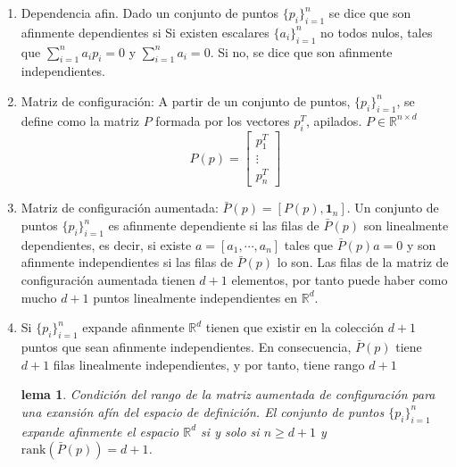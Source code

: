 \documentclass[10pt,a4paper]{article}
\newtheorem{lem}{lema}
\begin{document}
\begin{enumerate}
\item Dependencia afin. Dado un conjunto de puntos $\{p_i\}_{i=1}^n$ se dice que son afinmente dependientes si Si existen escalares $\{a_i\}_{i=1}^n$ no todos nulos, tales que $\sum_{i=1}^na_ip_i =0$ y $\sum_{i=1}^na_i=0$. Si no, se dice que son afinmente independientes.
\item Matriz de configuración: A partir de un conjunto de puntos, $\{p_i\}_{i=1}^n$, se define como la matriz $P$ formada por los vectores $p_i^T$, apilados. $P\in \mathbb{R}^{n\times d}$
\begin{equation}
P(p) = \begin{bmatrix}
p_1^T\\ \vdots \\ p_n^T
\end{bmatrix}
\end{equation}

\item Matriz de configuración aumentada: $\bar{P}(p) =[P(p), \mathbf{1}_n]$. Un conjunto de puntos $\{p_i\}_{i=1}^n$ es afinmente dependiente si las filas de $\bar{P}(p)$ son linealmente dependientes, es decir, si existe $a = [a_1,\cdots, a_n]$ tales que $\bar{P}(p)a = 0$ y son afinmente independientes si las filas de $\bar{P}(p)$ lo son. Las filas de la matriz de configuración aumentada tienen $d+1$ elementos, por tanto puede haber como mucho $d+1$ puntos linealmente independientes en $\mathbb{R}^d$.

\item Si $\{p_i\}_{i=1}^n$ expande afinmente $\mathbb{R}^d$ tienen que existir en la colección $d+1$ puntos que sean afinmente independientes. En consecuencia, $\bar{P}(p)$ tiene $d+1$ filas linealmente independientes, y por tanto, tiene rango $d+1$
\begin{lem}{Condición del rango de la matriz aumentada de configuración para una exansión afín del espacio de definición.}
El conjunto de puntos $\{p_i\}_{i=1}^n$ expande afinmente el espacio $\mathbb{R}^d$ si y solo si $n \geq d+1$ y $\textrm{rank}(\bar{P}(p)) = d+1$.
\end{lem}
\end{enumerate}




\end{document}
